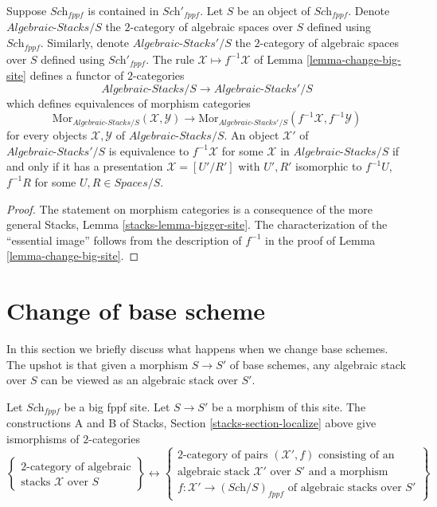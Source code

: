 \begin{lemma}
\label{lemma-fully-faithful}
Suppose $\textit{Sch}_{fppf}$ is contained in $\textit{Sch}'_{fppf}$.
Let $S$ be an object of $\textit{Sch}_{fppf}$. Denote
$\textit{Algebraic-Stacks}/S$ the $2$-category of algebraic spaces over $S$
defined using $\textit{Sch}_{fppf}$. Similarly, denote
$\textit{Algebraic-Stacks}'/S$ the $2$-category of algebraic spaces over $S$
defined using $\textit{Sch}'_{fppf}$. The rule
$\mathcal{X} \mapsto f^{-1}\mathcal{X}$ of
Lemma \ref{lemma-change-big-site}
defines a functor of $2$-categories
$$
\textit{Algebraic-Stacks}/S \longrightarrow \textit{Algebraic-Stacks}'/S
$$
which defines equivalences of morphism categories
$$
\text{Mor}_{\textit{Algebraic-Stacks}/S}(\mathcal{X}, \mathcal{Y})
\longrightarrow
\text{Mor}_{\textit{Algebraic-Stacks}'/S}(f^{-1}\mathcal{X}, f^{-1}\mathcal{Y})
$$
for every objects $\mathcal{X}, \mathcal{Y}$ of
$\textit{Algebraic-Stacks}/S$. An object
$\mathcal{X}'$ of $\textit{Algebraic-Stacks}'/S$
is equivalence to $f^{-1}\mathcal{X}$ for some
$\mathcal{X}$ in $\textit{Algebraic-Stacks}/S$
if and only if it has a presentation $\mathcal{X} = [U'/R']$
with $U', R'$ isomorphic to $f^{-1}U$, $f^{-1}R$ for some
$U, R \in \textit{Spaces}/S$.
\end{lemma}

\begin{proof}
The statement on morphism categories is a consequence of the more general
Stacks, Lemma \ref{stacks-lemma-bigger-site}.
The characterization of the ``essential image'' follows from the description
of $f^{-1}$ in the proof of
Lemma \ref{lemma-change-big-site}.
\end{proof}


\section{Change of base scheme}
\label{section-change-base-scheme}

\noindent
In this section we briefly discuss what happens when we change base schemes.
The upshot is that given a morphism $S \to S'$ of base schemes, any algebraic
stack over $S$ can be viewed as an algebraic stack over $S'$.

\begin{lemma}
\label{lemma-category-of-spaces-over-smaller-base-scheme}
Let $\textit{Sch}_{fppf}$ be a big fppf site.
Let $S \to S'$ be a morphism of this site.
The constructions A and B of
Stacks, Section \ref{stacks-section-localize}
above give ismorphisms of $2$-categories
$$
\left\{
\begin{matrix}
2\text{-category of algebraic}\\
\text{stacks }\mathcal{X}\text{ over }S
\end{matrix}
\right\}
\leftrightarrow
\left\{
\begin{matrix}
2\text{-category of pairs }(\mathcal{X}', f)\text{ consisting of an}\\
\text{algebraic stack }\mathcal{X}'\text{ over }S'\text{ and a morphism}\\
f : \mathcal{X}' \to (\textit{Sch}/S)_{fppf}\text{ of algebraic stacks over }S'
\end{matrix}
\right\}
$$
\end{lemma}

